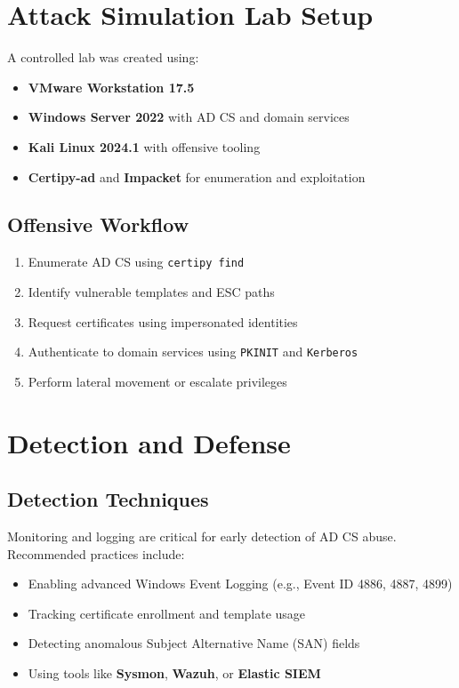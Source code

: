 \section{Attack Simulation Lab Setup}

A controlled lab was created using:
\begin{itemize}
    \item \textbf{VMware Workstation 17.5}
    \item \textbf{Windows Server 2022} with AD CS and domain services
    \item \textbf{Kali Linux 2024.1} with offensive tooling
    \item \textbf{Certipy-ad} and \textbf{Impacket} for enumeration and exploitation
\end{itemize}

\subsection{Offensive Workflow}

\begin{enumerate}
    \item Enumerate AD CS using \texttt{certipy find}
    \item Identify vulnerable templates and ESC paths
    \item Request certificates using impersonated identities
    \item Authenticate to domain services using \texttt{PKINIT} and \texttt{Kerberos}
    \item Perform lateral movement or escalate privileges
\end{enumerate}

\section{Detection and Defense}

\subsection{Detection Techniques}

Monitoring and logging are critical for early detection of AD CS abuse. Recommended practices include:
\begin{itemize}
    \item Enabling advanced Windows Event Logging (e.g., Event ID 4886, 4887, 4899)
    \item Tracking certificate enrollment and template usage
    \item Detecting anomalous Subject Alternative Name (SAN) fields
    \item Using tools like \textbf{Sysmon}, \textbf{Wazuh}, or \textbf{Elastic SIEM}
\end{itemize}

